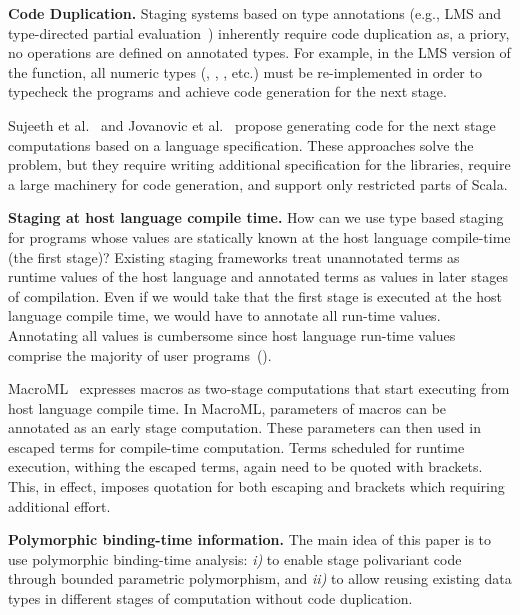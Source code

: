 {\bf Code Duplication.} Staging systems based on type annotations (e.g., LMS and type-directed
partial evaluation~\cite{danvy1999type}) inherently require code duplication as,
a priory, no operations are defined on  annotated types. For example,
in the LMS version of the  function, all numeric types (\ie, , , etc.)
must be re-implemented in order to typecheck the programs and achieve code generation
for the next stage.

Sujeeth et al.~\cite{forge} and Jovanovic et al.~\cite{yin-yang}
 propose generating code for the next stage computations based on
 a language specification. These approaches solve the problem,
 but they require writing additional specification for the libraries,
 require a large machinery for code generation,
 and support only restricted parts of Scala.

{\bf Staging at host language compile time.} How can we use type based staging for programs whose values are statically
 known at the host language compile-time (the first stage)? Existing staging frameworks
 treat unannotated terms as runtime values of the host language and annotated terms as
 values in later stages of compilation. Even if we would take that the first stage is executed
 at the host language compile time, we would have to annotate all run-time values.
 Annotating all values is cumbersome since host language run-time values comprise
 the majority of user programs~().


MacroML~\cite{ganz2001macros} expresses macros as two-stage computations that start executing from host language compile time.
 In MacroML, parameters of macros can be annotated as an early stage computation. These parameters
 can then used in escaped terms for compile-time computation. Terms scheduled for runtime execution,
 withing the escaped terms, again need to be quoted with brackets. This,
 in effect, imposes quotation for both escaping and brackets which requiring additional effort.


{\bf Polymorphic binding-time information.} The main idea of this paper is to use polymorphic binding-time analysis:
 \emph{i)} to enable stage polivariant code through bounded parametric polymorphism, and \emph{ii)} to allow reusing existing
 data types in different stages of computation without code duplication.

